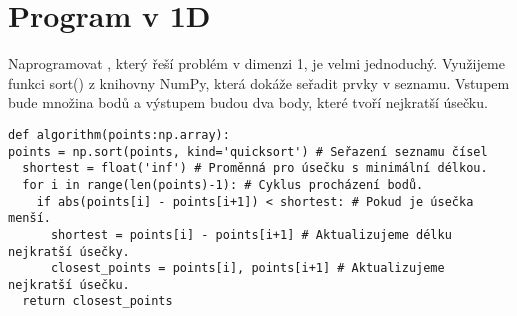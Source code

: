 \section{Program v 1D}
\label{sec:program_1D}
Naprogramovat , který řeší problém v dimenzi 1, je velmi jednoduchý. Využijeme funkci sort() z knihovny NumPy, která dokáže seřadit prvky v seznamu. Vstupem bude množina bodů a výstupem budou dva body, které tvoří nejkratší úsečku.

\begin{mdframed}[style=MyFrame]
\begin{lstlisting}[style=metoo]
def algorithm(points:np.array):
points = np.sort(points, kind='quicksort') # Seřazení seznamu čísel
  shortest = float('inf') # Proměnná pro úsečku s minimální délkou.
  for i in range(len(points)-1): # Cyklus procházení bodů.
    if abs(points[i] - points[i+1]) < shortest: # Pokud je úsečka menší.
      shortest = points[i] - points[i+1] # Aktualizujeme délku nejkratší úsečky.
      closest_points = points[i], points[i+1] # Aktualizujeme nejkratší úsečku.
  return closest_points
\end{lstlisting}
\end{mdframed}
